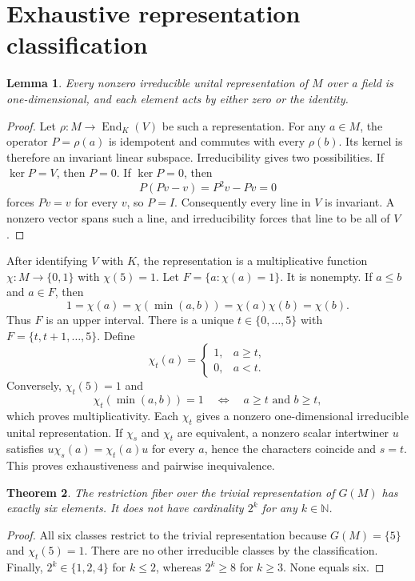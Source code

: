 \documentclass[11pt]{article}
\newtheorem{theorem}{Theorem}
\newtheorem{lemma}[theorem]{Lemma}
\newcommand{\End}{\operatorname{End}}
\begin{document}
\section{Exhaustive representation classification}
\begin{lemma}
Every nonzero irreducible unital representation of $M$ over a field is one-dimensional, and each element acts by either zero or the identity.
\end{lemma}
\begin{proof}
Let $\rho:M\to\End_K(V)$ be such a representation. For any $a\in M$, the operator $P=\rho(a)$ is idempotent and commutes with every $\rho(b)$. Its kernel is therefore an invariant linear subspace. Irreducibility gives two possibilities. If $\ker P=V$, then $P=0$. If $\ker P=0$, then
\[
 P(Pv-v)=P^2v-Pv=0
\]
forces $Pv=v$ for every $v$, so $P=I$. Consequently every line in $V$ is invariant. A nonzero vector spans such a line, and irreducibility forces that line to be all of $V$.
\end{proof}

After identifying $V$ with $K$, the representation is a multiplicative function $\chi:M\to\{0,1\}$ with $\chi(5)=1$. Let $F=\{a:\chi(a)=1\}$. It is nonempty. If $a\le b$ and $a\in F$, then
\[
 1=\chi(a)=\chi(\min(a,b))=\chi(a)\chi(b)=\chi(b).
\]
Thus $F$ is an upper interval. There is a unique $t\in\{0,\ldots,5\}$ with $F=\{t,t+1,\ldots,5\}$. Define
\[
 \chi_t(a)=\begin{cases}1,&a\ge t,\\0,&a<t.\end{cases}
\]
Conversely, $\chi_t(5)=1$ and
\[
 \chi_t(\min(a,b))=1\quad\Longleftrightarrow\quad a\ge t\text{ and }b\ge t,
\]
which proves multiplicativity. Each $\chi_t$ gives a nonzero one-dimensional irreducible unital representation. If $\chi_s$ and $\chi_t$ are equivalent, a nonzero scalar intertwiner $u$ satisfies
$u\chi_s(a)=\chi_t(a)u$ for every $a$, hence the characters coincide and $s=t$. This proves exhaustiveness and pairwise inequivalence.

\begin{theorem}
The restriction fiber over the trivial representation of $G(M)$ has exactly six elements. It does not have cardinality $2^k$ for any $k\in\mathbb N$.
\end{theorem}
\begin{proof}
All six classes restrict to the trivial representation because $G(M)=\{5\}$ and $\chi_t(5)=1$. There are no other irreducible classes by the classification. Finally, $2^k\in\{1,2,4\}$ for $k\le2$, whereas $2^k\ge8$ for $k\ge3$. None equals six.
\end{proof}
\end{document}
